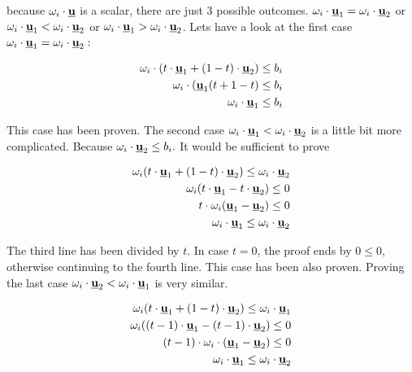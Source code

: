 \documentclass[a4paper,11pt,titlepage]{article}
\newcommand{\uvec}{\textbf{\underline{u}}}
\begin{document}
because $\omega_i \cdot \uvec$ is a scalar, there are just 3 possible outcomes. $\omega_i \cdot \uvec_1 = \omega_i \cdot \uvec_2$ or $\omega_i \cdot \uvec_1 < \omega_i \cdot \uvec_2$ or $\omega_i \cdot \uvec_1 > \omega_i \cdot \uvec_2$. Lets have a look at the first case $\omega_i \cdot \uvec_1 = \omega_i \cdot \uvec_2:$


\begin{equation}
\begin{split}
\omega_i \cdot (t \cdot \uvec_1 + (1-t) \cdot \uvec_2) \leq b_i\\
\omega_i \cdot (\uvec_1(t+1-t) \leq b_i\\
\omega_i \cdot \uvec_1 \leq b_i
\end{split}
\end{equation}

This case has been proven. The second case $\omega_i \cdot \uvec_1 < \omega_i \cdot \uvec_2$ is a little bit more complicated. Because $\omega_i \cdot \uvec_2 \leq b_i.$ It would be sufficient to prove 

\begin{equation}
\label{eq:conv_proof_1_less_2}
\begin{split}
\omega_i(t \cdot \uvec_1 + (1-t) \cdot \uvec_2) \leq \omega_i \cdot \uvec_2\\
\omega_i(t \cdot \uvec_1 -t \cdot \uvec_2) \leq 0\\
t \cdot \omega_i(\uvec_1 - \uvec_2) \leq 0\\
\omega_i \cdot \uvec_1 \leq \omega_i \cdot \uvec_2
\end{split}
\end{equation}

The third line has been divided by $t$. In case $t = 0$, the proof ends by $0 \leq 0$, otherwise continuing to the fourth line. This case has been also proven. Proving the last case $\omega_i \cdot \uvec_2 < \omega_i \cdot \uvec_1$ is very similar. 

\begin{equation}
\label{eq:conv_proof_2_less_1}
\begin{split}
\omega_i(t \cdot \uvec_1 + (1-t) \cdot \uvec_2) \leq \omega_i \cdot \uvec_1\\
\omega_i((t - 1) \cdot \uvec_1 - (t - 1) \cdot \uvec_2) \leq 0 \\
(t - 1) \cdot \omega_i \cdot (\uvec_1 - \uvec_2) \leq 0 \\
\omega_i \cdot \uvec_1 \leq \omega_i \cdot \uvec_2
\end{split}
\end{equation}
\end{document}
